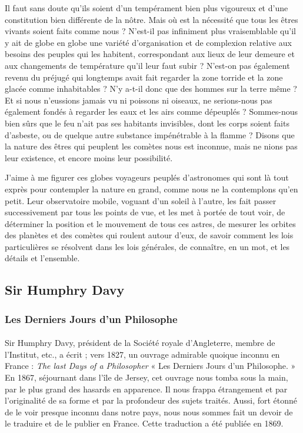 \documentclass[a4paper, 11pt, oneside, landscape]{article}
\begin{document}
Il faut sans doute qu'ils soient d'un tempérament bien plus vigoureux et d'une constitution bien différente de la nôtre. Mais où est la nécessité que tous les êtres vivants soient faits comme nous ? N'est-il pas infiniment plus vraisemblable qu'il y ait de globe en globe une variété d'organisation et de complexion relative aux besoins des peuples qui les habitent, correspondant aux lieux de leur demeure et aux changements de température qu'il leur faut subir ? N'est-on pas également revenu du préjugé qui longtemps avait fait regarder la zone torride et la zone glacée comme inhabitables ? N'y a-t-il donc que des hommes sur la terre même ? Et si nous n'eussions jamais vu ni poissons ni oiseaux, ne serions-nous pas également fondés à regarder les eaux et les airs comme dépeuplés ? Sommes-nous bien sûrs que le feu n'ait pas ses habitants invisibles, dont les corps soient faits d'asbeste, ou de quelque autre substance impénétrable à la flamme ? Disons que la nature des êtres qui peuplent les comètes nous est inconnue, mais ne nions pas leur existence, et encore moins leur possibilité.

J'aime à me figurer ces globes voyageurs peuplés d'astronomes qui sont là tout exprès pour contempler la nature en grand, comme nous ne la contemplons qu'en petit. Leur observatoire mobile, voguant d'un soleil à l'autre, les fait passer successivement par tous les points de vue, et les met à portée de tout voir, de déterminer la position et le mouvement de tous ces astres, de mesurer les orbites des planètes et des comètes qui roulent autour d'eux, de savoir comment les lois particulières se résolvent dans les lois générales, de connaître, en un mot, et les détails et l'ensemble.
\clearpage
\subsection{Sir Humphry Davy}
\subsubsection{Les Derniers Jours d'un Philosophe}
\paragraph{}
Sir Humphry Davy, président de la Société royale d'Angleterre, membre de l'Institut, etc., a écrit ; vers 1827, un ouvrage admirable quoique inconnu en France : \emph{The last Days of a Philosopher} « Les Derniers Jours d'un Philosophe. » En 1867, séjournant dans l'île de Jersey, cet ouvrage nous tomba sous la main, par le plus grand des hasards en apparence. Il nous frappa étrangement et par l'originalité de sa forme et par la profondeur des sujets traités. Aussi, fort étonné de le voir presque inconnu dans notre pays, nous nous sommes fait un devoir de le traduire et de le publier en France. Cette traduction a été publiée en 1869.
\end{document}
